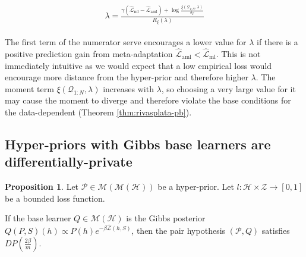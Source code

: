 \documentclass{article}
\theoremstyle{definition}
\newtheorem{proposition}[theorem]{Proposition}
\begin{document}
\begin{align} \label{eq:meta-pb-lambda}
\begin{split}
\lambda = \frac{\gamma(\hat{\mathcal{L}}_{\mathrm{ml}}-\hat{\mathcal{L}}_{\mathrm{aml}})+\log\frac{\xi(\mathcal{Q}_{1:N},\lambda)}{\delta_T}}{R_\xi(\lambda)}
\end{split}
\end{align}

The first term of the numerator serve encourages a lower value for $\lambda$ if there is a positive prediction gain from meta-adaptation $\hat{\mathcal{L}}_{\mathrm{aml}}<\hat{\mathcal{L}}_{\mathrm{ml}}$. This is not immediately intuitive as we would expect that a low empirical loss would encourage more distance from the hyper-prior and therefore higher $\lambda$. The moment term $\xi(\mathcal{Q}_{1:N}, \lambda)$ increases with $\lambda$, so choosing a very large value for it may cause the moment to diverge and therefore violate the base conditions for the data-dependent (Theorem \ref{thm:rivasplata-pb}). 

%
%
%

\subsection{Hyper-priors with Gibbs base learners are differentially-private} \label{append:proof-dp}

\begin{proposition} \label{thm:pair-is-dp-appendix}
	Let $\mathcal{P}\in \mathcal{M}(\mathcal{M}(\mathcal{H}))$ be a hyper-prior.
	Let $l:\mathcal{H}\times \mathcal{Z}\rightarrow [0,1]$ be a bounded loss function.
	
	If the base learner $Q\in \mathcal{M}(\mathcal{H})$ is the Gibbs posterior $Q(P, S)(h)\propto P(h)e^{-\beta\hat{\mathcal{L}}(h, S)}$, 
	then the pair hypothesis $(\mathcal{P}, Q)$ satisfies $DP\left (\frac{2\beta}{m}\right )$.
\end{proposition}
\end{document}
